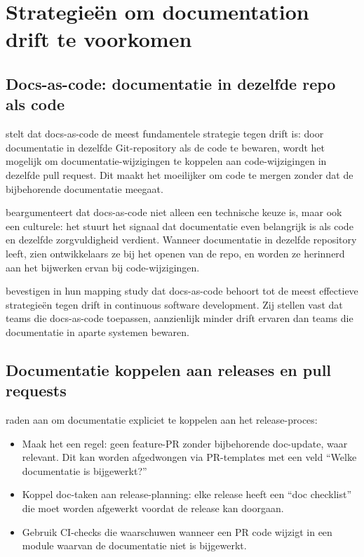 \section{Strategieën om documentation drift te voorkomen}
\label{sec:drift-preventie}

\subsection{Docs-as-code: documentatie in dezelfde repo als code}
\textcite{gentle2017docslikecode} stelt dat docs-as-code de meest fundamentele strategie tegen drift is: door documentatie in dezelfde Git-repository als de code te bewaren, wordt het mogelijk om documentatie-wijzigingen te koppelen aan code-wijzigingen in dezelfde pull request. Dit maakt het moeilijker om code te mergen zonder dat de bijbehorende documentatie meegaat.

\textcite{etter2016moderntechwriting} beargumenteert dat docs-as-code niet alleen een technische keuze is, maar ook een culturele: het stuurt het signaal dat documentatie even belangrijk is als code en dezelfde zorgvuldigheid verdient. Wanneer documentatie in dezelfde repository leeft, zien ontwikkelaars ze bij het openen van de repo, en worden ze herinnerd aan het bijwerken ervan bij code-wijzigingen.

\textcite{theunissen2022mappingdocumentation} bevestigen in hun mapping study dat docs-as-code behoort tot de meest effectieve strategieën tegen drift in continuous software development. Zij stellen vast dat teams die docs-as-code toepassen, aanzienlijk minder drift ervaren dan teams die documentatie in aparte systemen bewaren.

\subsection{Documentatie koppelen aan releases en pull requests}
\textcite{bhatti2021docsdevelopers} raden aan om documentatie expliciet te koppelen aan het release-proces:

\begin{itemize}
    \item Maak het een regel: geen feature-PR zonder bijbehorende doc-update, waar relevant. Dit kan worden afgedwongen via PR-templates met een veld ``Welke documentatie is bijgewerkt?''
    \item Koppel doc-taken aan release-planning: elke release heeft een ``doc checklist'' die moet worden afgewerkt voordat de release kan doorgaan.
    \item Gebruik CI-checks die waarschuwen wanneer een PR code wijzigt in een module waarvan de documentatie niet is bijgewerkt.
\end{itemize}

